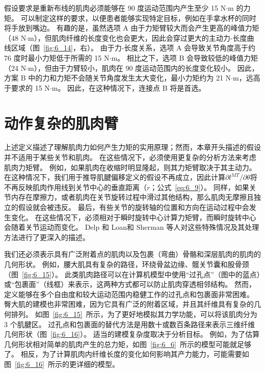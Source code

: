 假设要求是重新布线的肌肉必须能够在 90 度运动范围内产生至少 15 N$\cdot$m 的力矩。
可以制定这样的要求，以便患者能够实现特定目标，例如在手拿水杯的同时将手放到嘴边。
有趣的是，虽然选项 A 由于力矩臂较大而会产生更高的峰值力矩（48 N$\cdot$m），但肌肉纤维的长度变化也会更大，因此会穿过更大的主动力-长度曲线区域（图~\ref{fig:6_14}，右）。
由于力-长度关系，选项 A 会导致关节角度高于约 76 度时最小力矩低于所需的 15 N$\cdot$m。
相比之下，选项 B 会导致较低的峰值力矩（24 N$\cdot$m），但由于力臂较小，肌肉在 90 度运动范围内的长度变化较小。
因此，方案 B 中的力和力矩不会随关节角度发生太大变化，最小力矩约为 21 N$\cdot$m，远高于要求的 15 N$\cdot$m。
因此，在这种情况下，连接点 B 将是首选。



\section{动作复杂的肌肉臂}

上述定义描述了理解肌肉力如何产生力矩的实用原理；然而，本章开头描述的假设并不适用于某些关节和肌肉。
在这些情况下，必须使用更复杂的分析方法来考虑肌肉力矩臂。
例如，如果肌肉在收缩时明显隆起，则其力矩臂取决于其主动力。
在这种情况下，我们用于推导肌腱偏移定义的假设不再成立，因此计算$\partial l^{MT} / \partial \theta$将不再反映肌肉作用线到关节中心的垂直距离（$r$；公式~\ref{eq:6_9}）。
同样，如果关节内存在摩擦力，或者肌肉在关节旋转过程中滑过其他结构，那么肌肉无摩擦且独立的假设就会被违反。
最后，有些关节的旋转轴的位置和方向在运动过程中会发生变化。
在这些情况下，必须相对于瞬时旋转中心计算力矩臂，而瞬时旋转中心会随着关节运动而变化。 
Delp 和 Loan\cite{delp1995graphics}和 Sherman 等人\cite{sherman2013moment}对这些特殊情况及其处理方法进行了更深入的描述。


我们还必须表示具有广泛附着点的肌肉以及包裹（弯曲）骨骼和深层肌肉的肌肉的几何形状。
例如，腰大肌具有复杂的路径，环绕骨盆边缘、髋关节囊和股骨颈（图~\ref{fig:6_15}）。
此类肌肉路径可以在计算机模型中使用“过孔点”（图中的蓝点）或“包裹面”（线框）来表示，这两种方式都可以防止肌肉穿透相邻结构。
然而，定义能够在多个自由度和较大运动范围内稳健工作的过孔点和包裹面非常困难。
臀大肌的建模也非常困难，因为它具有广泛的附着区域，并且其纤维具有复杂的几何排列。
如图~\ref{fig:6_15}~所示，为了更好地模拟其力学功能，可以将该肌肉分为 3 个肌腱区。
过孔点和包裹面的替代方法是用数十或数百条路径来表示三维纤维几何形状（图~\ref{fig:6_16}）。
适当的建模复杂度取决于分析目标。
例如，为了估算几何形状相对简单的肌肉产生的总力矩，如图~\ref{fig:6_6}~所示的模型可能就足够了。
相反，为了计算肌肉内纤维长度的变化如何影响其产力能力，可能需要如图~\ref{fig:6_16}~所示的更详细的模型。


